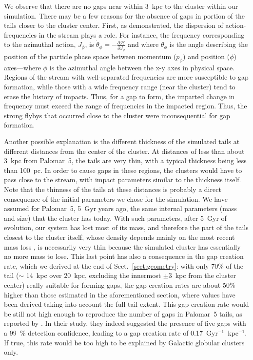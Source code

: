 \documentclass[draft]{aa}
\begin{document}
    We observe that there are no gaps near within 3~kpc to the cluster within our simulation. There may be a few reasons for the absence of gaps in portion of the tails closer to the cluster center. First, as \citet{2016MNRAS.457.3817S} demonstrated, the dispersion of action-frequencies in the stream plays a role. For instance, the frequency corresponding to the azimuthal action, $J_\phi$, is $\dot\theta_\phi = - \frac{\mathcal{\partial H}}{\partial J_\phi}$ and where $\theta_\phi$ is the angle describing the position of the particle phase space between momentum ($p_\phi$) and position ($\phi$) axes---where $\phi$ is the azimuthal angle between the x-y axes in physical space. Regions of the stream with well-separated frequencies are more susceptible to gap formation, while those with a wide frequency range (near the cluster) tend to erase the history of impacts. Thus, for a gap to form, the imparted change in frequency must exceed the range of frequencies in the impacted region. Thus, the strong flybys that occurred close to the cluster were inconsequential for gap formation. 
    
    Another possible explanation is the different thickness of the simulated tails at different distances from the center of the cluster. At distances of less than about 3~kpc from Palomar~5, the tails are very thin, with a typical thickness being less than 100~pc. In order to cause gaps in these regions, the clusters would have to pass close to the stream, with impact parameters similar to the thickness itself. Note that the thinness of the tails at these distances is probably a direct consequence of the initial parameters we chose for the simulation. We have assumed for Palomar~5, 5~Gyr years ago, the same internal parameters (mass and size) that the cluster has today. With such parameters, after 5~Gyr of evolution, our system has lost most of its mass, and therefore the part of the tails closest to the cluster itself, whose density depends mainly on the most recent mass loss \citep[see, for example, Fig.~A.3 in][]{2012A&A...546L...7M}, is necessarily very thin because the simulated cluster has essentially no more mass to lose. This last point has also a consequence in the gap creation rate, which we derived at the end of Sect.~\ref{sect:geometry}: with only 70\% of the tail  ($\sim$ 14~kpc over 20~kpc, excluding the innermost $\pm 3$~kpc from the cluster center) really suitable for forming gaps, the gap creation rates are about 50$\%$ higher than those estimated in the aforementioned section, where values have been derived taking into account the full tail extent. This gap creation rate would be still not high enough to reproduce the  number of gaps in Palomar~5 tails, as reported by \citet{2012ApJ...760...75C}. In their study, they indeed suggested the presence of  five gaps with a 99~\% detection confidence, leading to a gap creation rate of 0.17~Gyr$^{-1}$~kpc$^{-1}$. If true, this rate would be too high to be explained by Galactic globular clusters only. 
\end{document}
